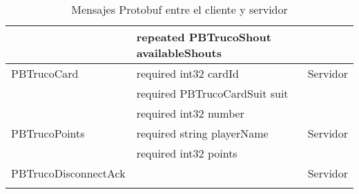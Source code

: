 \begin{longtable}{|p{}|p{}|p{}|}
                    & repeated PBTrucoShout availableShouts & \\
    \hline
    PBTrucoCard & required int32 cardId & Servidor \\
                & required PBTrucoCardSuit suit & \\
                & required int32 number & \\
    \hline
    PBTrucoPoints & required string playerName & Servidor \\
                    & required int32 points & \\
    \hline
    PBTrucoDisconnectAck &  & Servidor \\
    \hline
\caption{Mensajes Protobuf entre el cliente y servidor} \\
\end{longtable}

